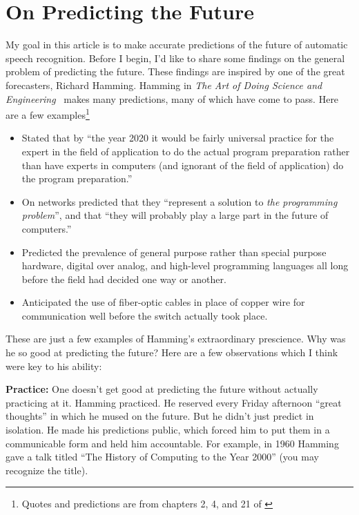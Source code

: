 \section{On Predicting the Future}
\label{sec:predicting_future}

My goal in this article is to make accurate predictions of the future of
automatic speech recognition. Before I begin, I'd like to share some findings
on the general problem of predicting the future. These findings are inspired by
one of the great forecasters, Richard Hamming. Hamming in \emph{The Art of
Doing Science and Engineering}~\citep{hamming1997art} makes many predictions,
many of which have come to pass. Here are a few examples\footnote{Quotes and
predictions are from chapters 2, 4, and 21 of \citet{hamming1997art}}
\begin{itemize}
    \item Stated that by ``the year 2020 it would be fairly universal
        practice for the expert in the field of application to do the actual
        program preparation rather than have experts in computers (and ignorant
        of the field of application) do the program preparation.''
    \item On networks predicted that they ``represent a solution to
        \emph{the programming problem}'', and that ``they will probably play a
        large part in the future of computers.''
    \item Predicted the prevalence of general purpose rather than special
        purpose hardware, digital over analog, and high-level programming
        languages all long before the field had decided one way or
        another.
    \item Anticipated the use of fiber-optic cables in place of copper wire for
        communication well before the switch actually took place.
\end{itemize}

These are just a few examples of Hamming's extraordinary prescience. Why was he
so good at predicting the future? Here are a few observations which I think
were key to his ability:

{\bf Practice:} One doesn't get good at predicting the future without actually
practicing at it. Hamming practiced. He reserved every Friday afternoon ``great
thoughts'' in which he mused on the future. But he didn't just predict in
isolation. He made his predictions public, which forced him to put them in a
communicable form and held him accountable. For example, in 1960 Hamming gave a
talk titled ``The History of Computing to the Year 2000'' (you may recognize
the title).

